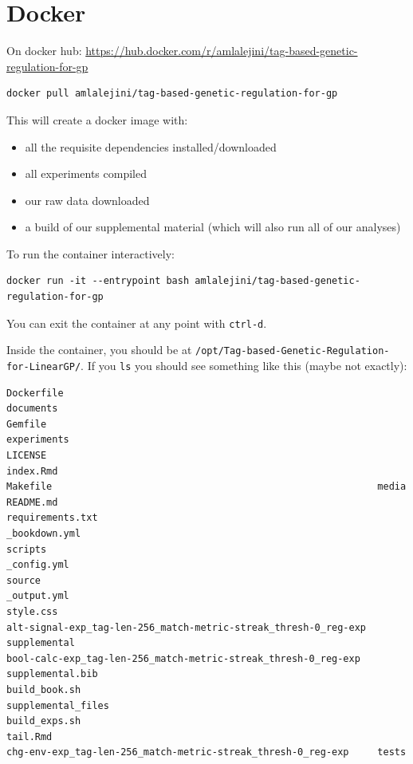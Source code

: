 \documentclass[
]{book}
\providecommand{\tightlist}{%
  \setlength{\itemsep}{0pt}\setlength{\parskip}{0pt}}
\begin{document}
\hypertarget{docker}{%
\section{Docker}\label{docker}}

On docker hub: \url{https://hub.docker.com/r/amlalejini/tag-based-genetic-regulation-for-gp}

\begin{verbatim}
docker pull amlalejini/tag-based-genetic-regulation-for-gp
\end{verbatim}

This will create a docker image with:

\begin{itemize}
\tightlist
\item
  all the requisite dependencies installed/downloaded
\item
  all experiments compiled
\item
  our raw data downloaded
\item
  a build of our supplemental material (which will also run all of our analyses)
\end{itemize}

To run the container interactively:

\begin{verbatim}
docker run -it --entrypoint bash amlalejini/tag-based-genetic-regulation-for-gp
\end{verbatim}

You can exit the container at any point with \texttt{ctrl-d}.

Inside the container, you should be at \texttt{/opt/Tag-based-Genetic-Regulation-for-LinearGP/}.
If you \texttt{ls} you should see something like this (maybe not exactly):

\begin{verbatim}
Dockerfile                                                       documents
Gemfile                                                          experiments
LICENSE                                                          index.Rmd
Makefile                                                         media
README.md                                                        requirements.txt
_bookdown.yml                                                    scripts
_config.yml                                                      source
_output.yml                                                      style.css
alt-signal-exp_tag-len-256_match-metric-streak_thresh-0_reg-exp  supplemental
bool-calc-exp_tag-len-256_match-metric-streak_thresh-0_reg-exp   supplemental.bib
build_book.sh                                                    supplemental_files
build_exps.sh                                                    tail.Rmd
chg-env-exp_tag-len-256_match-metric-streak_thresh-0_reg-exp     tests
\end{verbatim}
\end{document}
